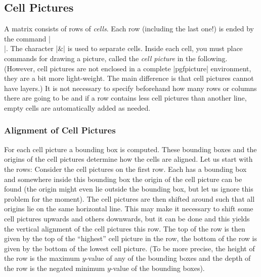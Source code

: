 \subsection{Cell Pictures}
\label{section-tikz-cell-pictures}
A matrix consists of rows of \emph{cells}. Each row (including the
last one!) is ended by the command |\\|. The character |&| is used
to separate cells. Inside each cell, you must place commands for
drawing a picture, called the \emph{cell picture} in the
following. (However, cell pictures are not enclosed in a complete
|{pgfpicture}| environment, they are a bit more light-weight. The main
difference is that cell pictures cannot have layers.) It is not
necessary to specify beforehand how many rows or columns there are
going to be and if a row contains less cell pictures than another
line, empty cells are automatically added as needed.


\subsubsection{Alignment of Cell Pictures}

For each cell picture a bounding box is computed. These bounding boxes
and the origins of the cell pictures determine how the cells are
aligned. Let us start with the rows: Consider the cell pictures on the first
row. Each has a bounding box and somewhere inside this bounding box
the origin of the cell picture can be found (the origin might even lie
outside the bounding box, but let us ignore this problem for the
moment). The cell pictures are then shifted around such that all
origins lie on the same horizontal line. This may make it necessary to
shift some cell pictures upwards and others downwards, but it can be
done and this yields the vertical alignment of the cell pictures this
row. The top of the row is then given by the top of the ``highest''
cell picture in the row, the bottom of the row is given by the bottom
of the lowest cell picture. (To be more precise, the height of the row
is the maximum $y$-value of any of the bounding boxes and the depth of
the row is the negated minimum $y$-value of the bounding boxes).

\begin{codeexample}[]
\end{codeexample}

